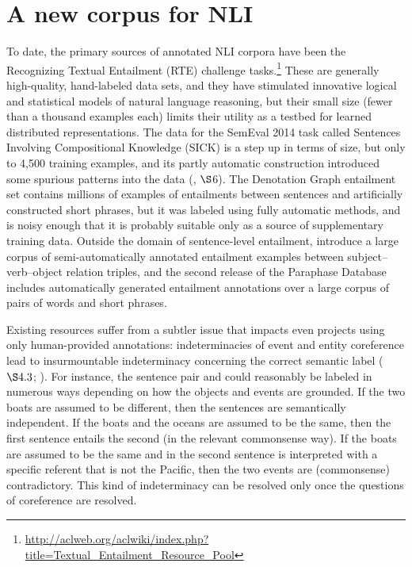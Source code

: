 
\section{A new corpus for NLI}\label{sec:discussion}

To date, the primary sources of annotated NLI corpora have been the
Recognizing Textual Entailment (RTE)
challenge tasks.\footnote{\url{http://aclweb.org/aclwiki/index.php?title=Textual_Entailment_Resource_Pool}}
These are generally high-quality, hand-labeled data sets, and they
have stimulated innovative logical and statistical models of natural
language reasoning, but their small size (fewer than a thousand examples each)
limits their utility as a testbed for learned distributed representations. 
The data for the SemEval 2014 task called Sentences Involving Compositional Knowledge (SICK) is a step up in terms of size, but only to 4,500 training examples, and its
partly automatic construction introduced some spurious patterns into
the data (\citealt{marelli2014semeval}, $\S$6). The
Denotation Graph entailment set \cite{hodoshimage} contains millions of
examples of entailments between sentences and artificially constructed
short phrases, but it was labeled using fully automatic methods, and is
noisy enough that it is probably suitable only as a source of
supplementary training data. 
Outside the domain of sentence-level entailment,  introduce
a large corpus of semi-automatically annotated entailment examples 
between subject--verb--object relation triples, and the second release of the 
Paraphase Database \cite{ganitkevitch2ppdb} includes automatically generated entailment annotations
over a large corpus of pairs of words and short phrases.

Existing resources suffer from a subtler issue that impacts even
projects using only human-provided annotations: indeterminacies of
event and entity coreference lead to insurmountable indeterminacy
concerning the correct semantic label (\citealt{de2008finding} $\S4.3$; \citealt{marelli2014sick}). For
instance, the sentence pair  and  could reasonably be labeled in
numerous ways depending on how the objects and events are grounded. If
the two boats are assumed to be different, then the sentences are semantically
independent. If the boats and the oceans are assumed to be the same,
then the first sentence entails the second (in the relevant
commonsense way). If the boats are assumed to be the same and 
 in the second sentence is interpreted with a specific referent 
that is not the Pacific, then the two events are (commonsense) contradictory. This
kind of indeterminacy can be resolved only once the questions of
coreference are resolved.

